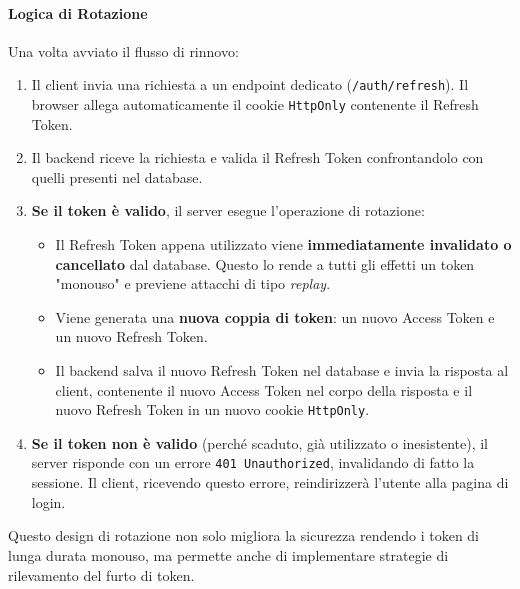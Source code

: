 \documentclass[12pt,a4paper,openright,twoside]{book}
\begin{document}
\paragraph{Logica di Rotazione} Una volta avviato il flusso di rinnovo:
\begin{enumerate}
    \item Il client invia una richiesta a un endpoint dedicato (\texttt{/auth/refresh}). Il browser allega automaticamente il cookie \texttt{HttpOnly} contenente il Refresh Token.
    \item Il backend riceve la richiesta e valida il Refresh Token confrontandolo con quelli presenti nel database.
    \item \textbf{Se il token è valido}, il server esegue l'operazione di rotazione:
    \begin{itemize}
        \item Il Refresh Token appena utilizzato viene \textbf{immediatamente invalidato o cancellato} dal database. Questo lo rende a tutti gli effetti un token "monouso" e previene attacchi di tipo \textit{replay}.
        \item Viene generata una \textbf{nuova coppia di token}: un nuovo Access Token e un nuovo Refresh Token.
        \item Il backend salva il nuovo Refresh Token nel database e invia la risposta al client, contenente il nuovo Access Token nel corpo della risposta e il nuovo Refresh Token in un nuovo cookie \texttt{HttpOnly}.
    \end{itemize}
    \item \textbf{Se il token non è valido} (perché scaduto, già utilizzato o inesistente), il server risponde con un errore \texttt{401 Unauthorized}, invalidando di fatto la sessione. Il client, ricevendo questo errore, reindirizzerà l'utente alla pagina di login.
\end{enumerate}
Questo design di rotazione non solo migliora la sicurezza rendendo i token di lunga durata monouso, ma permette anche di implementare strategie di rilevamento del furto di token.
\end{document}
